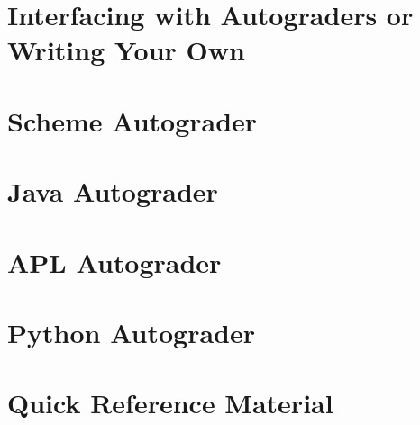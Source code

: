 \chapter{Interfacing with Autograders or Writing Your Own}

\chapter{Scheme Autograder}

\chapter{Java Autograder}

\chapter{APL Autograder}

\chapter{Python Autograder}

\chapter{Quick Reference Material}

\bye
